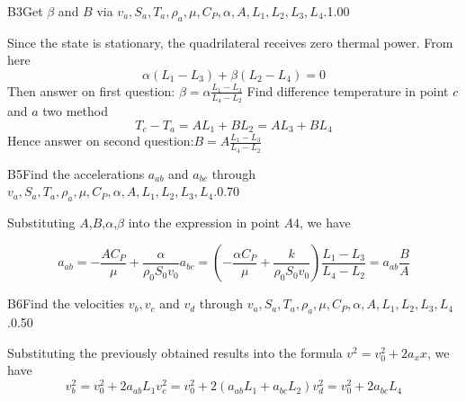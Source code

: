 \documentclass[11pt,a4paper]{article}
\begin{document}
\begin{solcard}{B3}{Get $\beta$ and $B$ via $v_a, S_a, T_a, \rho_a, \mu, C_P, \alpha, A, L_1, L_2, L_3, L_4$.}{1.00}

Since the state is stationary, the quadrilateral receives zero thermal power. From here$$
\alpha(L_1-L_3)+\beta(L_2-L_4)=0$$ Then answer on first question: $\beta=\alpha\frac{L_1-L_3}{L_4-L_2}$ Find difference temperature in point  $c$ and $a$   two method$$
T_c-T_a=AL_1+BL_2=AL_3+BL_4$$ Hence answer on second question:$B=A\frac{L_1-L_3}{L_4-L_2}$

\end{solcard}


\begin{solcard}{B5}{Find the accelerations $a_{ab}$ and $a_{bc}$ through $v_a, S_a, T_a, \rho_a, \mu, C_P, \alpha, A, L_1, L_2, L_3, L_4$.}{0.70}

Substituting $A$,$B$,$\alpha$,$\beta$ into the expression in point $A4$, we have 

 $$a_{ab}=-\frac{AC_P}{\mu}+\frac{\alpha}{\rho_0S_0v_0}

 

a_{bc}=\left(-\frac{\alpha C_P}{\mu}+\frac{k}{\rho_0S_0v_0}\right)\frac{L_1-L_3}{L_4-L_2}=a_{ab}\frac{B}{A}$$

\end{solcard}

\begin{solcard}{B6}{Find the velocities $v_b, v_c$ and $v_d$ through $v_a, S_a, T_a, \rho_a, \mu, C_P, \alpha, A, L_1, L_2, L_3, L_4$.}{0.50}

Substituting the previously obtained results into the formula $v^2=v_0^2+2{a_x}x$, we have$$
v_b^2=v_0^2+2a_{ab}L_1

 

v_c^2=v_0^2+2(a_{ab}L_1+a_{bc}L_2)

 

v_d^2=v_0^2+2a_{bc}L_4$$

\end{solcard}
\end{document}
